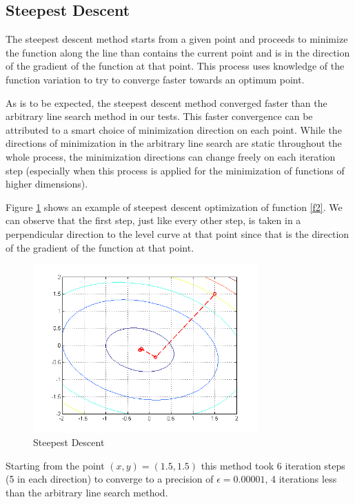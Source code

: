 \documentclass[journal]{IEEEtran}
\begin{document}
\subsection{Steepest Descent}

The steepest descent method starts from a given point and proceeds to minimize the function along the line than contains the current point and is in the direction of the gradient of the function at that point. This process uses knowledge of the function variation to try to converge faster towards an optimum point.

As is to be expected, the steepest descent method converged faster than the arbitrary line search method in our tests. This faster convergence can be attributed to a smart choice of minimization direction on each point. While the directions of minimization in the arbitrary line search are static throughout the whole process, the minimization directions can change freely on each iteration step (especially when this process is applied for the minimization of functions of higher dimensions). 

Figure \ref{figSD} shows an example of steepest descent optimization of function \ref{f2}. We can observe that the first step, just like every other step, is taken in a perpendicular direction to the level curve at that point since that is the direction of the gradient of the function at that point.

\begin{figure}[H]
\centering
\includegraphics[width=3.4in]{figures/2d-steepestDescent.png}
\caption{Steepest Descent}
\label{figSD}
\end{figure}

Starting from the point $(x,y) = (1.5,1.5)$ this method took 6 iteration steps (5 in each direction) to converge to a precision of $\epsilon = 0.00001$, 4 iterations less than the arbitrary line search method.
\end{document}
